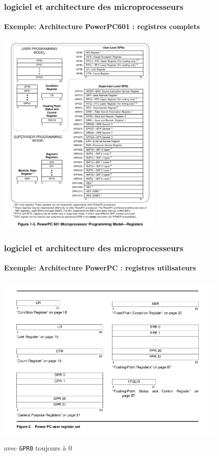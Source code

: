 \documentclass[xcolor=svgnames,final,smaller,a4]{beamer}
\begin{document}
\begin{frame}
  \frametitle{logiciel et architecture des microprocesseurs}
  \framesubtitle{Exemple: Architecture PowerPC601 : registres complets}
  \includegraphics[width=0.6\textwidth]{powerpc-registers}
\end{frame}

\begin{frame}
  \frametitle{logiciel et architecture des microprocesseurs}
  \framesubtitle{Exemple: Architecture PowerPC : registres utilisateurs}

  \includegraphics[width=0.85\textwidth]{powerpc-user-register}


  avec \texttt{GPR0} toujours à 0
\end{frame}
\end{document}
